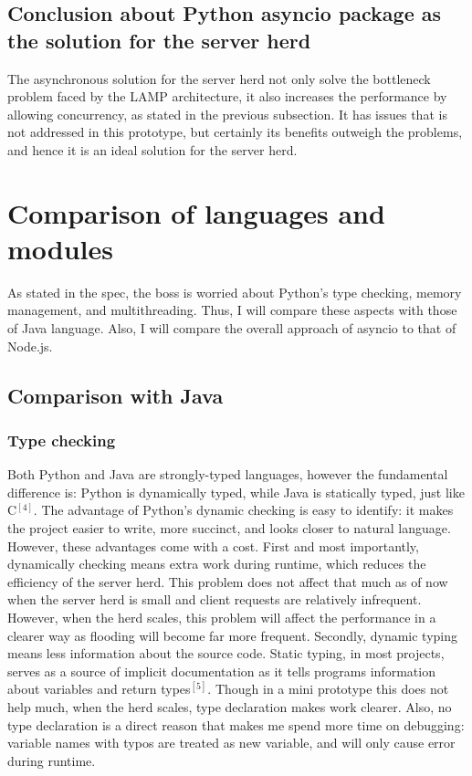 \documentclass[letterpaper,twocolumn,10pt]{article}
\begin{document}
\subsection{Conclusion about Python asyncio package as the solution for the server herd}
The asynchronous solution for the server herd not only solve the bottleneck problem faced by the LAMP architecture, it also increases the performance by allowing concurrency, as stated in the previous subsection. It has issues that is not addressed in this prototype, but certainly its benefits outweigh the problems, and hence it is an ideal solution for the server herd.

\section{Comparison of languages and modules}
As stated in the spec, the boss is worried about Python's type checking, memory management, and multithreading. Thus, I will compare these aspects with those of Java language. Also, I will compare the overall approach of asyncio to that of Node.js.

\subsection{Comparison with Java}
\subsubsection{Type checking}
Both Python and Java are strongly-typed languages, however the fundamental difference is: Python is dynamically typed, while Java is statically typed, just like C$^{[4]}$. The advantage of Python's dynamic checking is easy to identify: it makes the project easier to write, more succinct, and looks closer to natural language. However, these advantages come with a cost. First and most importantly, dynamically checking means extra work during runtime, which reduces the efficiency of the server herd. This problem does not affect that much as of now when the server herd is small and client requests are relatively infrequent. However, when the herd scales, this problem will affect the performance in a clearer way as flooding will become far more frequent. Secondly, dynamic typing means less information about the source code. Static typing, in most projects, serves as a source of implicit documentation as it tells programs information about variables and return types$^{[5]}$. Though in a mini prototype this does not help much, when the herd scales, type declaration makes work clearer. Also, no type declaration is a direct reason that makes me spend more time on debugging: variable names with typos are treated as new variable, and will only cause error during runtime. 
\end{document}
